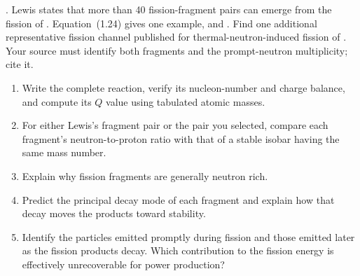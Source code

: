 .  Lewis
states that more than 40 fission-fragment pairs can emerge from the fission of
.  Equation~(1.24) gives one example,  and
.  Find one additional representative fission channel published
for thermal-neutron-induced fission of .  Your source must identify
both fragments and the prompt-neutron multiplicity; cite it.

\begin{enumerate}[label=(\alph*)]
\item Write the complete reaction, verify its nucleon-number and charge balance,
and compute its $Q$ value using tabulated atomic masses.
\item For either Lewis's fragment pair or the pair you selected, compare each
fragment's neutron-to-proton ratio with that of a stable isobar having the same
mass number.
\item Explain why fission fragments are generally neutron rich.
\item Predict the principal decay mode of each fragment and explain how that
decay moves the products toward stability.
\item Identify the particles emitted promptly during fission and those emitted
later as the fission products decay.  Which contribution to the fission energy
is effectively unrecoverable for power production?
\end{enumerate}

